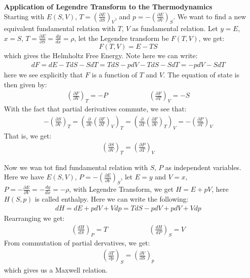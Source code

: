 \documentclass[11pt]{article}
\theoremstyle{break}
\theoremstyle{break}
\newcommand{\pd}{\partial}
\newcommand{\lr}[1]{\left( #1 \right)}
\begin{document}
\newpage
\textbf{Application of Legendre Transform to the Thermodynamics}\\

Starting with $E(S,V)$, $T = \lr{\frac{\pd E}{\pd S}}_V$, and $p = - \lr{\frac{\pd E}{\pd V}}_S$. We want to find a new equivalent fundamental relation with $T$, $V$ as fundamental relation. Let $y=E$, $x=S$, $T = \frac{\pd E}{\pd S} = \frac{d y}{dx} = \rho$, let the Legendre transform be $F(T,V)$, we get: $$F(T,V) = E- TS$$ 
which gives the Helmholtz Free Energy. Note here we can write:
\begin{align*}
dF = dE - TdS - SdT = TdS - pdV - TdS - SdT = -pdV - SdT
\end{align*}
here we see explicitly that $F$ is a function of $T$ and $V$. The equation of state is then given by:
\begin{align*}
\left(\frac{\pd F}{\pd V} \right)_T = -P \qquad \qquad \qquad \lr{\frac{\pd F}{\pd T}}_V = -S
\end{align*}
With the fact that partial derivatives commute, we see that:
\begin{align*}
 -\lr{\frac{\pd S}{\pd V}}_T =\left(\frac{\pd}{\pd V} \left(\frac{\pd F}{\pd T} \right)_V\right)_T = \lr{\frac{\pd}{\pd T} \lr{\frac{\pd F}{\pd V}}_T}_V = -\lr{\frac{\pd P}{\pd T}}_V
\end{align*}
That is, we get:
\begin{align*}
\lr{\frac{\pd S}{\pd V}}_T = \lr{\frac{\pd P}{\pd T}}_V
\end{align*}

Now we wan tot find fundamental relation with $S$, $P$ as independent variables. Here we have $E(S,V)$, $P = -\lr{\frac{\pd E}{\pd V}}_S$, let $E = y$ and $V = x$, $P = - \frac{\pd E}{\pd V} = -\frac{dy}{dx} = -\rho$, with Legendre Transform, we get $H = E+pV$, here $H(S,p)$ is called enthalpy. Here we can write the following:
\begin{align*}
dH = dE + pdV + Vdp = TdS - pdV + pdV + Vdp
\end{align*}
Rearranging we get:
\begin{align*}
\lr{\frac{dH}{dS}}_P = T \qquad \qquad \qquad \lr{\frac{dH}{dP}}_S = V
\end{align*}
From commutation of partial dervatives, we get:
\begin{align*}
\lr{\frac{\pd T}{\pd p}}_S = \lr{\frac{\pd V}{\pd S}}_p
\end{align*}
which gives us a Maxwell relation. \\
\end{document}
